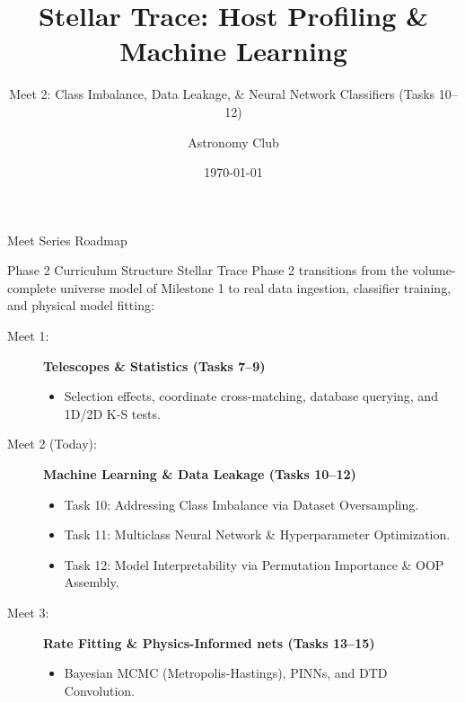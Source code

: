 \documentclass[9pt]{beamer}
\title{Stellar Trace: Host Profiling \& Machine Learning}
\subtitle{Meet 2: Class Imbalance, Data Leakage, \& Neural Network Classifiers (Tasks 10--12)}
\author{Astronomy Club}
\date{\today}
\begin{document}
\maketitle

\begin{frame}{Meet Series Roadmap}
  \begin{block}{Phase 2 Curriculum Structure}
    Stellar Trace Phase 2 transitions from the volume-complete universe model of Milestone 1 to real data ingestion, classifier training, and physical model fitting:
  \end{block}
  \begin{description}
    \item[Meet 1:] \textbf{Telescopes \& Statistics (Tasks 7--9)}
      \begin{itemize}
        \item Selection effects, coordinate cross-matching, database querying, and 1D/2D K-S tests.
      \end{itemize}
    \item[Meet 2 (Today):] \textbf{Machine Learning \& Data Leakage (Tasks 10--12)}
      \begin{itemize}
        \item Task 10: Addressing Class Imbalance via Dataset Oversampling.
        \item Task 11: Multiclass Neural Network \& Hyperparameter Optimization.
        \item Task 12: Model Interpretability via Permutation Importance \& OOP Assembly.
      \end{itemize}
    \item[Meet 3:] \textbf{Rate Fitting \& Physics-Informed nets (Tasks 13--15)}
      \begin{itemize}
        \item Bayesian MCMC (Metropolis-Hastings), PINNs, and DTD Convolution.
      \end{itemize}
  \end{description}
\end{frame}
\end{document}
